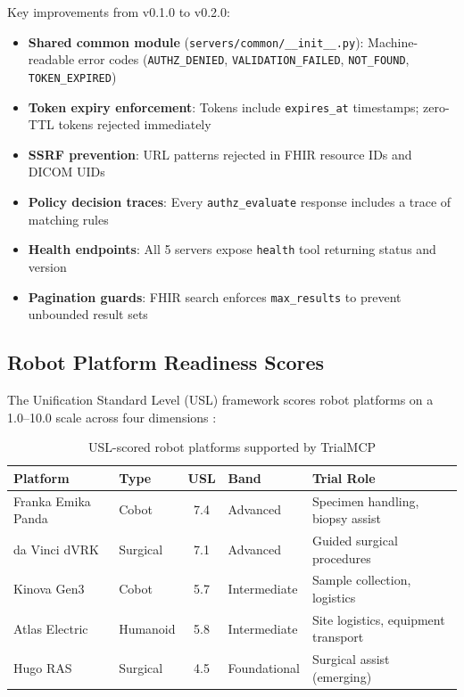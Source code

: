 \documentclass[10pt,letterpaper]{article}
\begin{document}
Key improvements from v0.1.0 to v0.2.0:
\begin{itemize}[leftmargin=2em]
    \item \textbf{Shared common module} (\texttt{servers/common/\_\_init\_\_.py}): Machine-readable error codes (\texttt{AUTHZ\_DENIED}, \texttt{VALIDATION\_FAILED}, \texttt{NOT\_FOUND}, \texttt{TOKEN\_EXPIRED})
    \item \textbf{Token expiry enforcement}: Tokens include \texttt{expires\_at} timestamps; zero-TTL tokens rejected immediately
    \item \textbf{SSRF prevention}: URL patterns rejected in FHIR resource IDs and DICOM UIDs
    \item \textbf{Policy decision traces}: Every \texttt{authz\_evaluate} response includes a trace of matching rules
    \item \textbf{Health endpoints}: All 5 servers expose \texttt{health} tool returning status and version
    \item \textbf{Pagination guards}: FHIR search enforces \texttt{max\_results} to prevent unbounded result sets
\end{itemize}

\subsection{Robot Platform Readiness Scores}

The Unification Standard Level (USL) framework scores robot platforms on a 1.0--10.0 scale across four dimensions \cite{kawchak2026usl}:

\begin{table}[H]
\centering
\caption{USL-scored robot platforms supported by TrialMCP}
\label{tab:usl}
\small
\begin{tabularx}{\textwidth}{l l c l X}
\toprule
\textbf{Platform} & \textbf{Type} & \textbf{USL} & \textbf{Band} & \textbf{Trial Role} \\
\midrule
Franka Emika Panda & Cobot & 7.4 & Advanced & Specimen handling, biopsy assist \\
da Vinci dVRK & Surgical & 7.1 & Advanced & Guided surgical procedures \\
Kinova Gen3 & Cobot & 5.7 & Intermediate & Sample collection, logistics \\
Atlas Electric & Humanoid & 5.8 & Intermediate & Site logistics, equipment transport \\
Hugo RAS & Surgical & 4.5 & Foundational & Surgical assist (emerging) \\
\bottomrule
\end{tabularx}
\end{table}
\end{document}
